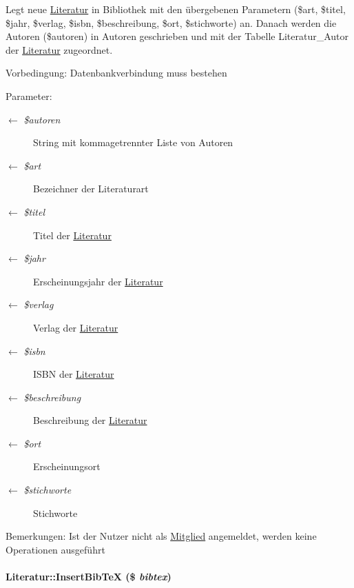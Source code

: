 Legt neue \hyperlink{classLiteratur}{Literatur} in Bibliothek mit den übergebenen Parametern (\$art, \$titel, \$jahr, \$verlag, \$isbn, \$beschreibung, \$ort, \$stichworte) an. Danach werden die Autoren (\$autoren) in Autoren geschrieben und mit der Tabelle Literatur\_\-Autor der \hyperlink{classLiteratur}{Literatur} zugeordnet. \begin{Desc}
\item[Vorbedingung:]Datenbankverbindung muss bestehen \end{Desc}
\begin{Desc}
\item[Parameter:]
\begin{description}
\item[\mbox{$\leftarrow$} {\em \$autoren}]String mit kommagetrennter Liste von Autoren \item[\mbox{$\leftarrow$} {\em \$art}]Bezeichner der Literaturart \item[\mbox{$\leftarrow$} {\em \$titel}]Titel der \hyperlink{classLiteratur}{Literatur} \item[\mbox{$\leftarrow$} {\em \$jahr}]Erscheinungsjahr der \hyperlink{classLiteratur}{Literatur} \item[\mbox{$\leftarrow$} {\em \$verlag}]Verlag der \hyperlink{classLiteratur}{Literatur} \item[\mbox{$\leftarrow$} {\em \$isbn}]ISBN der \hyperlink{classLiteratur}{Literatur} \item[\mbox{$\leftarrow$} {\em \$beschreibung}]Beschreibung der \hyperlink{classLiteratur}{Literatur} \item[\mbox{$\leftarrow$} {\em \$ort}]Erscheinungsort \item[\mbox{$\leftarrow$} {\em \$stichworte}]Stichworte \end{description}
\end{Desc}
\begin{Desc}
\item[Bemerkungen:]Ist der Nutzer nicht als \hyperlink{classMitglied}{Mitglied} angemeldet, werden keine Operationen ausgeführt \end{Desc}
\hypertarget{classLiteratur_d466a307b1971ee736e1d4ba9342dc55}{
\paragraph[InsertBibTeX]{\setlength{\rightskip}{0pt plus 5cm}Literatur::Insert\-Bib\-Te\-X (\$ {\em bibtex})}\hfill}
\label{classLiteratur_d466a307b1971ee736e1d4ba9342dc55}


